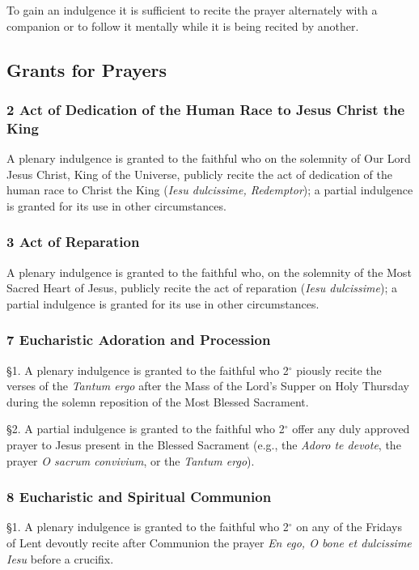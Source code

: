 \documentclass[12pt]{article}
\newcommand{\foreign}[1]{\textsl{#1}}
\begin{document}
 To gain an indulgence it is sufficient to recite the prayer alternately with a companion or to follow it mentally while it is being recited by another.

\subsection{Grants for Prayers}
\newcommand{\grant}[2]{\subsubsection*{#1 #2}}
\newcommand{\subgrant}[1]{§#1.}
\newcommand{\subsubgrant}[1]{#1$^\circ$}
\hypertarget{grant2}{\grant{2}{Act of Dedication of the Human Race to Jesus Christ the King}}
A plenary indulgence is granted to the faithful who on the solemnity of Our Lord Jesus Christ, King of the Universe, publicly recite the act of dedication of the human race to Christ the King (\foreign{Iesu dulcissime, Redemptor});
a partial indulgence is granted for its use in other circumstances.

\hypertarget{grant3}{\grant{3}{Act of Reparation}}
A plenary indulgence is granted to the faithful who, on the solemnity of the Most Sacred Heart of Jesus, publicly recite the act of reparation (\foreign{Iesu dulcissime}); a partial indulgence is granted for its use in other circumstances.

\hypertarget{grant7}{\grant{7}{Eucharistic Adoration and Procession}}
\subgrant{1} A plenary indulgence is granted to the faithful who \subsubgrant{2} piously recite the verses of the \foreign{Tantum ergo} after the Mass of the Lord’s Supper on Holy Thursday during the solemn reposition of the Most Blessed Sacrament.

\subgrant{2} A partial indulgence is granted to the faithful who \subsubgrant{2} offer any duly approved prayer to Jesus present in the Blessed Sacrament (e.g., the \foreign{Adoro te devote}, the prayer \foreign{O sacrum convivium}, or the \foreign{Tantum ergo}).

\hypertarget{grant8}{\grant{8}{Eucharistic and Spiritual Communion}}

\subgrant{1} A plenary indulgence is granted to the faithful who \subsubgrant{2} on any of the Fridays of Lent devoutly recite after Communion the prayer \foreign{En ego, O bone et dulcissime Iesu} before a crucifix.
\end{document}
